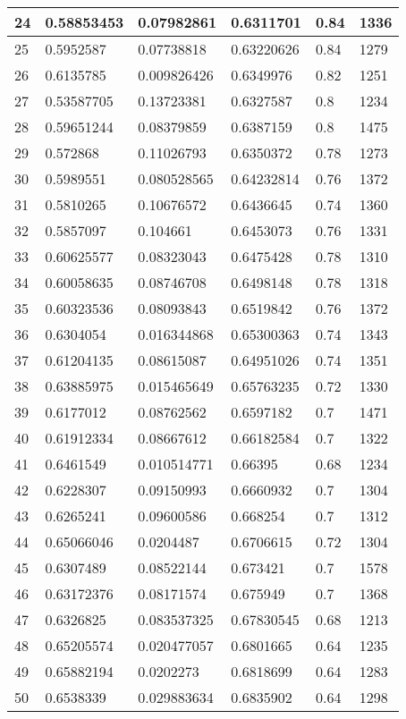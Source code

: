 \begin{longtable}{|l|l|l|l|l|l|}
24 & 0.58853453 & 0.07982861 & 0.6311701 & 0.84 & 1336 \\ \hline 
25 & 0.5952587 & 0.07738818 & 0.63220626 & 0.84 & 1279 \\ \hline 
26 & 0.6135785 & 0.009826426 & 0.6349976 & 0.82 & 1251 \\ \hline 
27 & 0.53587705 & 0.13723381 & 0.6327587 & 0.8 & 1234 \\ \hline 
28 & 0.59651244 & 0.08379859 & 0.6387159 & 0.8 & 1475 \\ \hline 
29 & 0.572868 & 0.11026793 & 0.6350372 & 0.78 & 1273 \\ \hline 
30 & 0.5989551 & 0.080528565 & 0.64232814 & 0.76 & 1372 \\ \hline 
31 & 0.5810265 & 0.10676572 & 0.6436645 & 0.74 & 1360 \\ \hline 
32 & 0.5857097 & 0.104661 & 0.6453073 & 0.76 & 1331 \\ \hline 
33 & 0.60625577 & 0.08323043 & 0.6475428 & 0.78 & 1310 \\ \hline 
34 & 0.60058635 & 0.08746708 & 0.6498148 & 0.78 & 1318 \\ \hline 
35 & 0.60323536 & 0.08093843 & 0.6519842 & 0.76 & 1372 \\ \hline 
36 & 0.6304054 & 0.016344868 & 0.65300363 & 0.74 & 1343 \\ \hline 
37 & 0.61204135 & 0.08615087 & 0.64951026 & 0.74 & 1351 \\ \hline 
38 & 0.63885975 & 0.015465649 & 0.65763235 & 0.72 & 1330 \\ \hline 
39 & 0.6177012 & 0.08762562 & 0.6597182 & 0.7 & 1471 \\ \hline 
40 & 0.61912334 & 0.08667612 & 0.66182584 & 0.7 & 1322 \\ \hline 
41 & 0.6461549 & 0.010514771 & 0.66395 & 0.68 & 1234 \\ \hline 
42 & 0.6228307 & 0.09150993 & 0.6660932 & 0.7 & 1304 \\ \hline 
43 & 0.6265241 & 0.09600586 & 0.668254 & 0.7 & 1312 \\ \hline 
44 & 0.65066046 & 0.0204487 & 0.6706615 & 0.72 & 1304 \\ \hline 
45 & 0.6307489 & 0.08522144 & 0.673421 & 0.7 & 1578 \\ \hline 
46 & 0.63172376 & 0.08171574 & 0.675949 & 0.7 & 1368 \\ \hline 
47 & 0.6326825 & 0.083537325 & 0.67830545 & 0.68 & 1213 \\ \hline 
48 & 0.65205574 & 0.020477057 & 0.6801665 & 0.64 & 1235 \\ \hline 
49 & 0.65882194 & 0.0202273 & 0.6818699 & 0.64 & 1283 \\ \hline 
50 & 0.6538339 & 0.029883634 & 0.6835902 & 0.64 & 1298 \\ \hline 
\end{longtable}